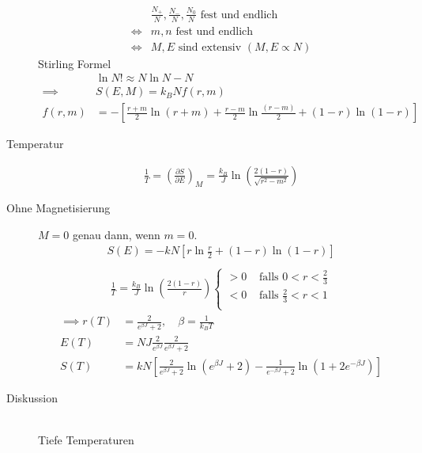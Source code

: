 \documentclass[11pt]{article}
\theoremstyle{plain}
\theoremstyle{mytheoremstyle}
\newcommand{\pd}[2]{\frac{\partial #1 }{\partial #2}}
\begin{document}
\begin{description}
    \begin{align*}
      & \frac{N_+}{N}, \frac{N_-}{N}, \frac{N_0}{N} \text{ fest und endlich } \\
      \iff & m,n \text{ fest und endlich} \\
      \iff & M,E \text{ sind extensiv } (M,E \propto N)
    \end{align*}
    Stirling Formel \begin{align*}
      & \ln{N!} \approx N \ln{N} - N \\
      \implies & S(E, M) = k_B N f(r, m) \\
      f(r, m ) & = - \left[ \frac{r+m}{2} \ln{(r+m)} + \frac{r - m}{2}
    \ln{\frac{(r - m)}{2}} + (1-r) \ln{(1 - r)} \right]
    \end{align*}
  \item[Temperatur]
    \begin{align*}
      \frac{1}{T} = \left( \pd{S}{E}  \right)_M = \frac{k_B}{J} 
      \ln{\left( \frac{2 (1-r)}{ \sqrt{r^2 - m^2}} \right)}
    \end{align*}
  \item[Ohne Magnetisierung] $M=0$ genau dann, wenn $m=0$.
    \begin{align*}
      S(E) = - k N [ r \ln{\frac{r}{2}} + (1-r) \ln{(1-r)}] \\
    \end{align*}
    \begin{align*}
      \frac{1}{T} = \frac{k_B}{ J } \ln{\left( \frac{2 ( 1-r)}{r} \right) }
       \begin{cases}
         > 0 & \text{ falls } 0 < r < \frac{2}{3} \\
         < 0 & \text{ falls }\frac{2}{3} < r < 1 \\
      \end{cases}
    \end{align*}
    \begin{align*}
      \implies  r (T) &= \frac{2}{e^{\beta J }+2 }, \quad  \beta= \frac{1}{k_B T} \\
                E(T)  &= NJ \frac{2}{e^{\beta J}} \frac{2}{e^{\beta J} + 2} \\
                S(T)  &= k N \left[ \frac{2}{e^{\beta J} + 2} \ln{(e^{\beta J} + 2)}
    - \frac{1}{e^{-\beta J} + 2} \ln{ \left( 1+ 2 e^{-\beta J} \right) }\right]
    \end{align*}
  \item[Diskussion] $ $  \\
    Tiefe Temperaturen \begin{align*}

\end{align*}
\end{description}
\end{document}
